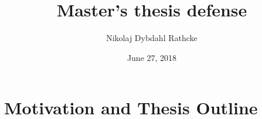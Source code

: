\documentclass{beamer}
\begin{document}
\title{Master's thesis defense}
\author{Nikolaj Dybdahl Rathcke}
\date{June 27, 2018}

\frame{\titlepage}


\section{Motivation and Thesis Outline}

\end{document}
